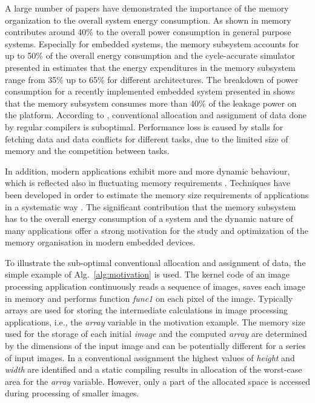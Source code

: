 \documentclass[smallcondensed]{svjour3}
\begin{document}
A large number of papers have demonstrated the importance of the memory organization to the overall system energy consumption. 
As shown in \cite{Gonzalez1996} memory contributes around 40\% to the overall power consumption in general purpose systems. 
Especially for embedded systems, the memory subsystem accounts for up to 50\% of the overall energy consumption \cite{Che09} and the cycle-accurate simulator presented in \cite{Ben99} estimates that the energy expenditures in the memory subsystem range from 35\% up to 65\% for different architectures. 
The breakdown of power consumption for a recently implemented embedded system presented in \cite{Hul11} shows that the memory subsystem consumes more than 40\% of the leakage power on the platform. 
According to \cite{tcm}, conventional allocation and assignment of data done by regular compilers is suboptimal. 
Performance loss is caused by stalls for fetching data and data conflicts for different tasks, due to the limited size of memory and the competition between tasks. 

In addition, modern applications exhibit more and more dynamic behaviour, which is reflected also in fluctuating memory requirements \cite{tcm}. 
Techniques have been developed in order to estimate the memory size requirements of applications in a systematic way \cite{Ang13}. 
The significant contribution that the memory subsystem has to the overall energy consumption of a system and the dynamic nature of many applications offer a strong motivation for the study and optimization of the memory organisation in modern embedded devices.

To illustrate the sub-optimal conventional allocation and assignment of data, the simple example of Alg.~\ref{alg:motivation} is used. 
The kernel code of an image processing application continuously reads a sequence of images, saves each image in memory and performs function \textit{func1} on each pixel of the image. 
Typically arrays are used for storing the intermediate calculations in image processing applications, i.e., the \textit{array} variable in the motivation example. 
The memory size used for the storage of each initial \textit{image} and the computed \textit{array} are determined by the dimensions of the input image and can be potentially different for a series of input images. 
In a conventional assignment the highest values of \textit{height} and \textit{width} are identified and a static compiling results in allocation of the worst-case area for the \textit{array} variable. 
However, only a part of the allocated space is accessed during processing of smaller images. 
\end{document}
